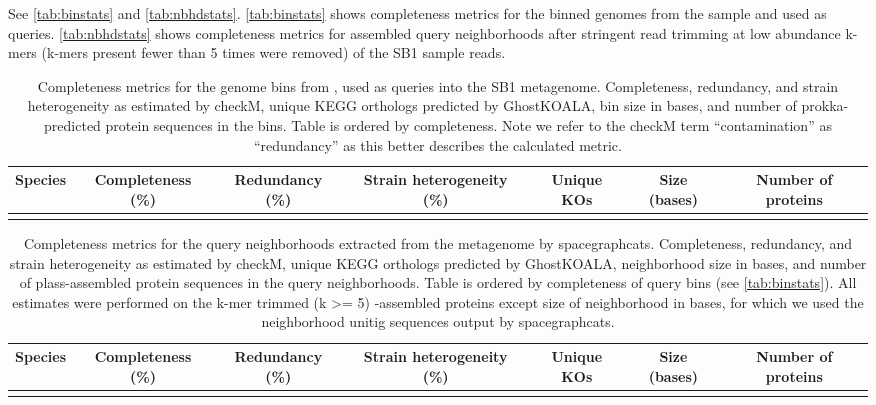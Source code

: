 See \autoref{tab:binstats} and
\autoref{tab:nbhdstats}. \autoref{tab:binstats} shows completeness metrics
for the binned genomes from the \hu sample and used as
queries.
\autoref{tab:nbhdstats} shows completeness metrics for \plass assembled
query neighborhoods after stringent read trimming at low abundance k-mers
(k-mers present fewer than 5 times were removed) of the SB1 sample reads.


\begin{table}
  \begin{tabular}{l c c c c c c}
    \toprule
    Species & Completeness (\%) & Redundancy (\%) & Strain heterogeneity (\%) & Unique KOs & Size (bases) & Number of proteins \\
    \midrule
    
\\
   \bottomrule
  \end{tabular}
  \caption{
   Completeness metrics for the \hu genome bins from \cite{Hu2016}, used as queries into the SB1 metagenome. Completeness, redundancy, and
   strain heterogeneity as estimated
   by checkM, unique KEGG orthologs predicted by GhostKOALA, bin size in
   bases, and number of prokka-predicted protein sequences in the \hu bins.
   Table is ordered by completeness. Note we refer to the checkM term
   ``contamination'' as ``redundancy'' as this better describes the calculated
   metric.}
  \label{tab:binstats}
 \end{table}

\begin{table}
  \begin{tabular}{l c c c c c c}
    \toprule
    Species & Completeness (\%) & Redundancy (\%) & Strain heterogeneity (\%) & Unique KOs & Size (bases) & Number of proteins \\
    \midrule
    
\\
    \bottomrule
  \end{tabular}
  \caption{
   Completeness metrics for the query neighborhoods extracted from the \hu metagenome by {\sf spacegraphcats}. Completeness, redundancy,
   and strain heterogeneity as estimated
   by checkM, unique KEGG orthologs predicted by GhostKOALA, neighborhood
   size in  bases, and number of plass-assembled  protein sequences in the
   query neighborhoods. Table is ordered by completeness of query bins (see
   \autoref{tab:binstats}). All estimates were performed on the k-mer trimmed
   (k >= 5) \plass-assembled proteins except size of neighborhood in bases,
   for which we used the neighborhood unitig sequences output by {\sf spacegraphcats}.}
  \label{tab:nbhdstats}
 \end{table}

